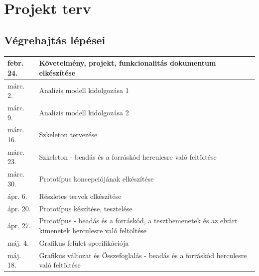 \section{Projekt terv}
\subsection{Végrehajtás lépései}
	\begin{tabular}{|l|l|}
		\hline
		febr. 24. & Követelmény, projekt, funkcionalitás dokumentum elkészítése                                            \\ \hline
		márc. 2.  & Analízis modell kidolgozása 1                                                                          \\ \hline
		márc. 9.  & Analízis modell kidolgozása 2                                                                          \\ \hline
		márc. 16. & Szkeleton tervezése                                                                                    \\ \hline
		márc. 23. & Szkeleton - beadás és a forráskód herculesre való feltöltése                                           \\ \hline
		márc. 30. & Prototípus koncepciójának elkészítése                                                                  \\ \hline
		ápr. 6.   & Részletes tervek elkészítése                                                                           \\ \hline
		ápr. 20.  & Prototípus készítése, tesztelése                                                                       \\ \hline
		ápr. 27.  & Prototípus - beadás és a forráskód, a tesztbemenetek és az elvárt kimenetek herculesre való feltöltése \\ \hline
		máj. 4.   & Grafikus felület specifikációja                                                                        \\ \hline
		máj. 18.  & Grafikus változat és Összefoglalás - beadás és a forráskód herculesre való feltöltése                  \\ \hline
	\end{tabular}


